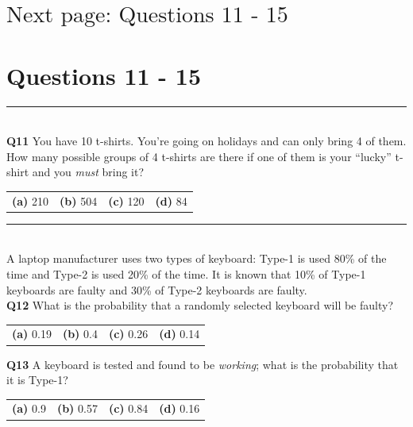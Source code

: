 \documentclass[12pt]{article}
\begin{document}
\section*{\hspace{8cm}$\boxed{\text{Next page: Questions 11 - 15}}$}

\newpage

\section*{Questions 11 - 15}


\rule{\linewidth}{1pt}
\quad\\
{\bf Q11} You have 10 t-shirts. You're going on holidays and can only bring 4 of them. How many possible groups of 4 t-shirts are there if one of them is your ``lucky'' t-shirt and you \emph{must} bring it?\\[0.2cm]
\begin{tabular}{cccc}
{\bf(a)} 210 & {\bf(b)} 504 & {\bf(c)} 120 & {\bf(d)} 84 \\[0.6cm]
\end{tabular}



\rule{\linewidth}{1pt}
\quad\\
A laptop manufacturer uses two types of keyboard: Type-1 is used 80\% of the time and Type-2 is used 20\% of the time. It is known that 10\% of Type-1 keyboards are faulty and 30\% of Type-2 keyboards are faulty.\\[0.3cm]

{\bf Q12} What is the probability that a randomly selected keyboard will be faulty?\\[0.2cm]
\begin{tabular}{cccc}
{\bf(a)} 0.19 & {\bf(b)} 0.4 & {\bf(c)} 0.26 & {\bf(d)} 0.14 \\[0.6cm]
\end{tabular}

{\bf Q13}  A keyboard is tested and found to be \emph{working}; what is the probability that it is Type-1?\\[0.2cm]
\begin{tabular}{cccc}
{\bf(a)} 0.9 & {\bf(b)} 0.57 & {\bf(c)} 0.84 & {\bf(d)} 0.16 \\[0.6cm]
\end{tabular}
\end{document}
